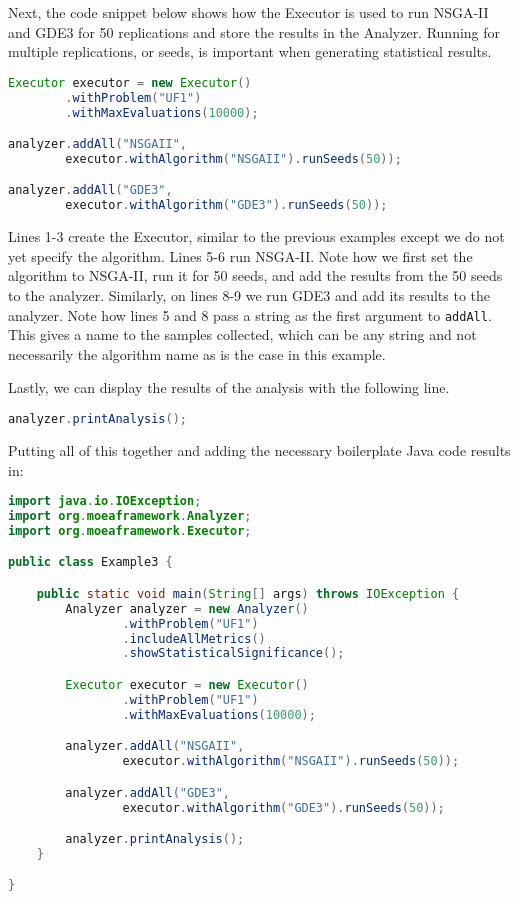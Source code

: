 Next, the code snippet below shows how the Executor is used to run NSGA-II and GDE3 for 50 replications and store the results in the Analyzer.  Running for multiple replications, or seeds, is important when generating statistical results.

\begin{lstlisting}[language=Java]
Executor executor = new Executor()
		.withProblem("UF1")
		.withMaxEvaluations(10000);

analyzer.addAll("NSGAII",  
		executor.withAlgorithm("NSGAII").runSeeds(50));

analyzer.addAll("GDE3",
		executor.withAlgorithm("GDE3").runSeeds(50));
\end{lstlisting}

Lines 1-3 create the Executor, similar to the previous examples except we do not yet specify the algorithm.  Lines 5-6 run NSGA-II.  Note how we first set the algorithm to NSGA-II, run it for 50 seeds, and add the results from the 50 seeds to the analyzer.  Similarly, on lines 8-9 we run GDE3 and add its results to the analyzer.  Note how lines 5 and 8 pass a string as the first argument to \texttt{addAll}.  This gives a name to the samples collected, which can be any string and not necessarily the algorithm name as is the case in this example.

Lastly, we can display the results of the analysis with the following line.

\begin{lstlisting}[language=Java]
analyzer.printAnalysis();
\end{lstlisting}

Putting all of this together and adding the necessary boilerplate Java code results in:

\begin{lstlisting}[language=Java]
import java.io.IOException;
import org.moeaframework.Analyzer;
import org.moeaframework.Executor;

public class Example3 {

	public static void main(String[] args) throws IOException {
		Analyzer analyzer = new Analyzer()
				.withProblem("UF1")
				.includeAllMetrics()
				.showStatisticalSignificance();

		Executor executor = new Executor()
				.withProblem("UF1")
				.withMaxEvaluations(10000);

		analyzer.addAll("NSGAII",  
				executor.withAlgorithm("NSGAII").runSeeds(50));

		analyzer.addAll("GDE3",
				executor.withAlgorithm("GDE3").runSeeds(50));

		analyzer.printAnalysis();
	}

}
\end{lstlisting}

